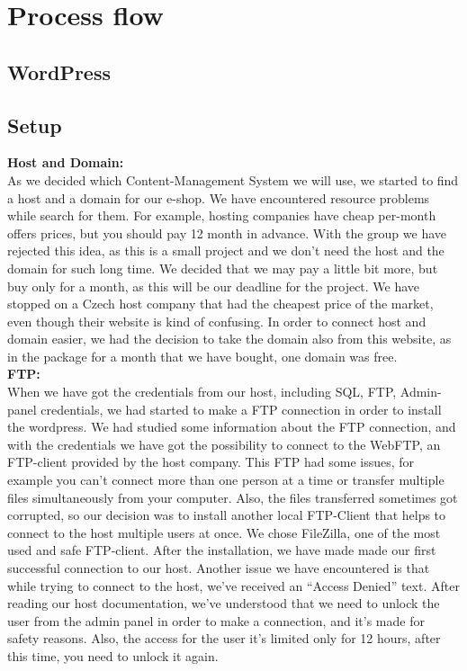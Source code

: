 \documentclass[12p]{article}
\begin{document}
\newpage


\newpage
\section{Process flow}

\subsection{WordPress}

\subsection{Setup}
\textbf{Host and Domain:}
\\
As we decided which Content-Management System we will use, we started to find a host and a domain for our e-shop. We have encountered resource problems while search for them. For example, hosting companies have cheap per-month offers prices, but you should pay 12 month in advance. With the group we have rejected this idea, as this is a small project and we don’t need the host and the domain for such long time. We decided that we may pay a little bit more, but buy only for a month, as this will be our deadline for the project. We have stopped on a Czech host company that had the cheapest price of the market, even though their website is kind of confusing. In order to connect host and domain easier, we had the decision to take the domain also from this website, as in the package for a month that we have  bought, one domain was free. \\

\textbf{FTP:}
\\
When we have got the credentials from our host, including SQL, FTP, Admin-panel credentials, we had started to make a FTP connection in order to install the wordpress. We had studied some information about the FTP connection, and with the credentials we have got the possibility to connect to the WebFTP, an FTP-client provided by the host company. This FTP had some issues, for example you can’t connect more than one person at a time or transfer multiple files simultaneously from your computer. Also, the files transferred sometimes got corrupted, so our decision was to install another local FTP-Client that helps to connect to the host multiple users at once. We chose FileZilla, one of the most used and safe FTP-client. After the installation, we have made made our first successful connection to our host. Another issue we have encountered is that while trying to connect to the host, we’ve received an “Access Denied” text. After reading our host documentation, we’ve understood that we need to unlock the user from the admin panel in order to make a connection, and it’s made for safety reasons. Also, the access for the user it’s limited only for 12 hours, after this time, you need to unlock it again. \\
\end{document}
